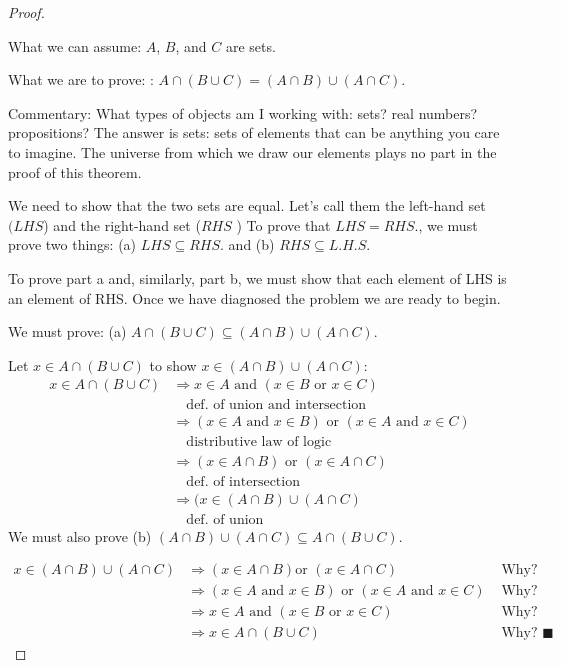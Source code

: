 \documentclass[10pt,]{book}
\theoremstyle{plain}
\theoremstyle{definition}
\theoremstyle{definition}
\theoremstyle{definition}
\begin{document}
\begin{proof}\hypertarget{proof-1}{}
What we can assume: \(A\), \(B\), and \(C\) are sets.%
\par
What we are to prove: : \(A\cap  (B \cup  C) = (A\cap B) \cup  (A \cap  C)\).%
\par
Commentary: What types of objects am I working with: sets? real numbers? propositions? The answer is sets: sets of elements
that can be anything you care to imagine. The universe from which we draw our elements plays no part in the proof of this theorem.%
\par
We need to show that the two sets are equal. Let's call them the left-hand set \((LHS\)) and the right-hand set (\(RHS\) ) To prove that \(LHS = RHS\)., we must prove two things: (a) \(LHS\subseteq RHS\). and (b) \(RHS\subseteq L.H.S\).%
\par
To prove part a and, similarly, part b, we must show that each element of LHS is an element of RHS.  Once we have diagnosed the problem we are ready to begin.%
\par
We must prove:
(a) \(A \cap  (B \cup  C)\subseteq (A\cap B) \cup  (A\cap C)\).%
\par

Let \(x \in  A\cap (B \cup  C)\) to show \(x\in (A\cap B) \cup  (A \cap C)\):
\begin{equation*}
\begin{split}
x \in A \cap (B \cup C) & \Rightarrow x\in A \textrm{ and } (x\in B\textrm{ or } x\in C)\\
	& \quad \textrm{def. of union and intersection}\\
	& \Rightarrow  (x \in A\textrm{ and }x\in B)\textrm{ or } (x\in A\textrm{ and }x\in C)\\
	&\quad \textrm{distributive law of logic}\\
	& \Rightarrow  (x \in A \cap B) \textrm{ or } (x \in A \cap C)\\
	&\quad \textrm{def. of intersection}\\
	& \Rightarrow  (x \in (A \cap B) \cup (A \cap C)\\
	&\quad \textrm{def. of union}
 \end{split}
\end{equation*}
We must also prove (b) \((A\cap B) \cup  (A\cap C)\subseteq A \cap  (B \cup  C)\).%
\par
\begin{equation*}
\begin{split}
x\in (A\cap B) \cup  (A \cap C)& \Rightarrow  (x\in A\cap B)\text{or } (x\in A\cap C)&\textrm{ Why? } \\
			& \Rightarrow (x\in A\textrm{ and }x\in B)\textrm{ or } (x\in A\textrm{ and }x\in C)&\textrm{ Why? }\\
			&\Rightarrow  x\in A \textrm{ and } (x\in B\textrm{ or }x\in C)&\textrm{ Why? }\\
			&\Rightarrow x\in A\cap (B\cup C)&\textrm{ Why? } \blacksquare
\end{split}
 \end{equation*}%
\end{proof}
\end{document}
